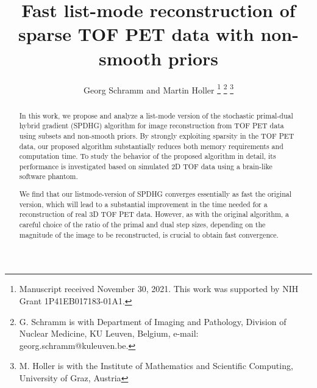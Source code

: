 \documentclass[10pt,twocolumn,twoside,letterpaper]{IEEEtran}
\begin{document}
\title{\vspace{-1cm}Fast list-mode reconstruction of sparse TOF PET data with non-smooth priors} 
%
%
%

\author{Georg Schramm and Martin Holler%
\thanks{Manuscript received November 30, 2021. This work was supported by NIH Grant 1P41EB017183-01A1.}
\thanks{G. Schramm is with Department of Imaging and Pathology, Division of Nuclear Medicine, KU Leuven, Belgium, e-mail: georg.schramm@kuleuven.be.}
\thanks{M. Holler is with the Institute of Mathematics and Scientific Computing, 
University of Graz, Austria}}


\maketitle



\begin{abstract}
In this work, we propose and analyze a list-mode version of the stochastic primal-dual hybrid gradient
(SPDHG) algorithm for image reconstruction from TOF PET data using subsets and non-smooth priors. 
By strongly exploiting sparsity in the TOF PET data, our proposed algorithm substantially reduces both memory requirements and computation time. 
To study the behavior of the proposed algorithm in detail, its performance 
is investigated based on simulated 2D TOF data using a brain-like software phantom.

We find that our listmode-version of SPDHG converges essentially as fast the original version,
which will lead to a substantial improvement in the time needed for a reconstruction
of real 3D TOF PET data.
However, as with the original algorithm, a careful choice of the ratio of the primal and dual step sizes, 
depending on the magnitude of the image to be reconstructed, is crucial to obtain fast convergence.
\end{abstract}
\end{document}
